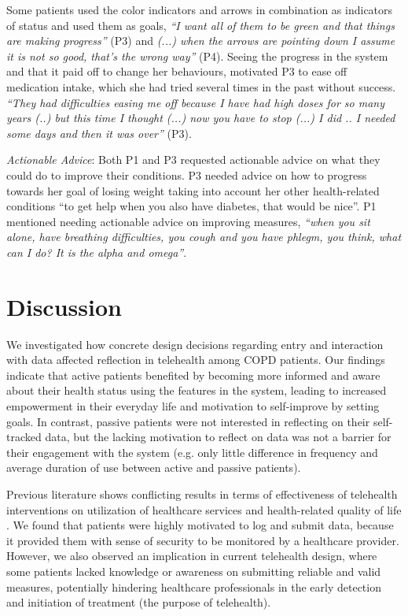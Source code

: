 Some patients used the color indicators and arrows in combination as indicators of status and used them as goals,  \textit{“I want all of them to be green and that things are making progress”} (P3) and \textit{(...) when the arrows are pointing down I assume it is not so good, that’s the wrong way”} (P4). Seeing the progress in the system and that it paid off to change her behaviours, motivated P3 to ease off medication intake, which she had tried several times in the past without success. \textit{“They had difficulties easing me off because I have had high doses for so many years (..) but this time I thought (...) now you have to stop (...) I did .. I needed some days and then it was over”} (P3). 

\textit{Actionable Advice}: Both P1 and P3 requested actionable advice on what they could do to improve their conditions. P3 needed advice on how to progress towards her goal of losing weight taking into account her other health-related conditions “to get help when you also have diabetes, that would be nice”. P1 mentioned needing actionable advice on improving measures, \textit{“when you sit alone, have breathing difficulties, you cough and you have phlegm, you think, what can I do? It is the alpha and omega”}. 

\section{Discussion} 
We investigated how concrete design decisions regarding entry and interaction with data affected reflection in telehealth among COPD patients. Our findings indicate that active patients benefited by becoming more informed and aware about their health status using the features in the system, leading to increased empowerment in their everyday life and motivation to self-improve by setting goals. In contrast, passive patients were not interested in reflecting on their self-tracked data, but the lacking motivation to reflect on data was not a barrier for their engagement with the system (e.g. only little difference in frequency and average duration of use between active and passive patients). 

Previous literature shows conflicting results in terms of effectiveness of telehealth interventions on utilization of healthcare services and health-related quality of life \cite{pedone}. We found that patients were highly motivated to log and submit data, because it provided them with sense of security to be monitored by a healthcare provider. However, we also observed an implication in current telehealth design, where some patients lacked knowledge or awareness on submitting reliable and valid measures, potentially hindering healthcare professionals in the early detection and initiation of treatment (the purpose of telehealth). 

